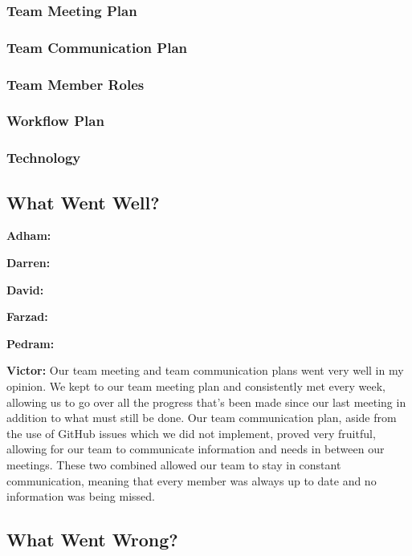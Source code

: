 \documentclass{article}
\begin{document}
\subsubsection{Team Meeting Plan}

\subsubsection{Team Communication Plan}

\subsubsection{Team Member Roles}

\subsubsection{Workflow Plan}

\subsubsection{Technology}

\subsection{What Went Well?}

\textbf{Adham:}

\textbf{Darren:}

\textbf{David:}

\textbf{Farzad:}

\textbf{Pedram:}

\textbf{Victor:} Our team meeting and team communication plans went very well in my opinion. We kept to our team meeting plan and consistently met every week, allowing us to go over all the progress that's been made since our last meeting in addition to what must still be done. Our team communication plan, aside from the use of GitHub issues which we did not implement, proved very fruitful, allowing for our team to communicate information and needs in between our meetings. These two combined allowed our team to stay in constant communication, meaning that every member was always up to date and no information was being missed.

\subsection{What Went Wrong?}
\end{document}
